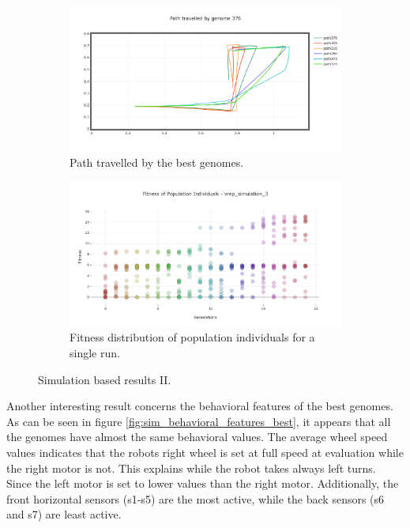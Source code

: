 \begin{figure}[H]
    \centering
    \begin{subfigure}[b]{0.8\textwidth}
    	\centering
        \includegraphics[width=14cm]{include/images/sim_path_travelled.PNG}
        \caption{Path travelled by the best genomes.}
        \label{fig:sim_path_travelled}
    \end{subfigure}
    \begin{subfigure}[b]{0.8\textwidth}
    	\centering
        \includegraphics[width=14cm]{include/images/sim_fitness_distribution.PNG}
        \caption{Fitness distribution of population individuals for a single run.}
        \label{fig:sim_fitness_distribution}
    \end{subfigure}
    \caption{Simulation based results II.}
	\label{fig:sim_based_resultsII}
\end{figure}

Another interesting result concerns the behavioral features of the best genomes. As can be seen in figure \ref{fig:sim_behavioral_features_best}, it appears that all the genomes have almost the same behavioral values. The average wheel speed values indicates that the robots right wheel is set at full speed at evaluation while the right motor is not. This explains while the robot takes always left turns. Since the left motor is set to lower values than the right motor. Additionally, the front horizontal sensors (s1-s5) are the most active, while the back sensors (s6 and s7) are least active.

